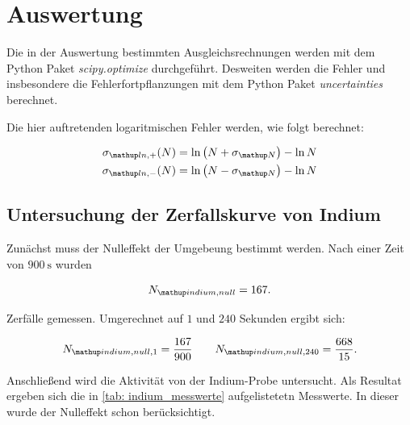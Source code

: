\section{Auswertung}

Die in der Auswertung bestimmten Ausgleichsrechnungen werden mit
dem Python Paket \emph{scipy.optimize}\cite{scipy} durchgeführt.
Desweiten werden die Fehler und insbesondere die Fehlerfortpflanzungen
mit dem Python Paket \emph{uncertainties}\cite{uncertainties} berechnet.

Die hier auftretenden logaritmischen Fehler werden, wie folgt berechnet:

\begin{align}
  \label{eq:log_fehler}
  \begin{aligned}
    \sigma\ua{ln,+}(N)=\ln{\left(N+\sigma\ua{N}\right)}-\ln{N}\\
    \sigma\ua{ln,-}(N)=\ln{\left(N-\sigma\ua{N}\right)}-\ln{N}
  \end{aligned}
\end{align}
\subsection{Untersuchung der Zerfallskurve von Indium}
Zunächst muss der Nulleffekt der Umgebeung bestimmt werden.
Nach einer Zeit von $\SI{900}{\second}$ wurden

\begin{equation*}
  N\ua{indium,null}=167.
\end{equation*}

Zerfälle gemessen. Umgerechnet auf $1$ und $240$ Sekunden ergibt sich:

\begin{equation}
  \label{eq:nulleffekt_indium}
  N\ua{indium,null,1}=\frac{167}{900} \qquad N\ua{indium,null,240}=\frac{668}{15}.
\end{equation}

Anschließend wird die Aktivität von der Indium-Probe untersucht.
Als Resultat ergeben sich die in \ref{tab: indium_messwerte} aufgelistetetn Messwerte.
In dieser wurde der Nulleffekt schon berücksichtigt.


